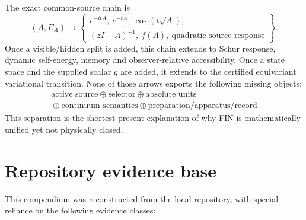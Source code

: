 \documentclass[11pt,a4paper]{article}
\theoremstyle{definition}
\theoremstyle{remark}
\begin{document}
The exact common-source chain is
\[
(A,E_A)
\longrightarrow
\left\{
\begin{array}{c}
e^{-itA},\ e^{-tA},\ \cos(t\sqrt A),\\
(zI-A)^{-1},\ f(A),\ \text{quadratic source response}
\end{array}
\right\}.
\]
Once a visible/hidden split is added, this chain extends to Schur response, dynamic self-energy, memory and observer-relative accessibility. Once a state space and the supplied scalar $g$ are added, it extends to the certified equivariant variational transition. None of those arrows exports the following missing objects:
\[
\boxed{\begin{gathered}
\text{active source}\oplus\text{selector}\oplus\text{absolute units}\\
{}\oplus\text{continuum semantics}\oplus\text{preparation/apparatus/record}
\end{gathered}}
\]
This separation is the shortest present explanation of why FIN is mathematically unified yet not physically closed.

\section{Repository evidence base}

This compendium was reconstructed from the local repository, with special reliance on the following evidence classes:
\end{document}
